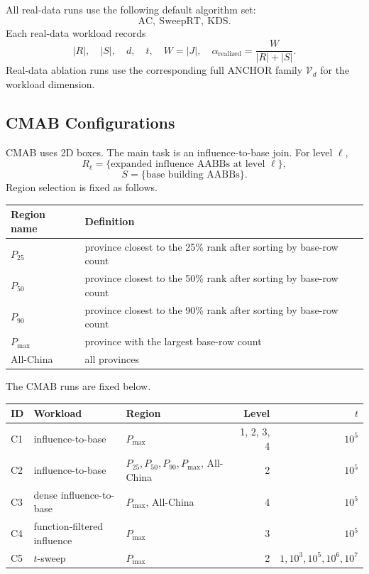 \documentclass[11pt]{article}
\newcommand{\ANCHOR}{\textsc{ANCHOR}}
\begin{document}
All real-data runs use the following default algorithm set:
\[
\boxed{\mathrm{AC},\ \mathrm{SweepRT},\ \mathrm{KDS}}.
\]
Each real-data workload records
\[
|R|,\quad |S|,\quad d,\quad t,\quad W=|J|,\quad
\alpha_{\mathrm{realized}}=\frac{W}{|R|+|S|}.
\]
Real-data ablation runs use the corresponding full \ANCHOR{} family $\mathcal{V}_d$ for the workload dimension.

\subsection{CMAB Configurations}
CMAB uses 2D boxes.  The main task is an influence-to-base join.  For level $\ell$,
\[
R_\ell=\{\text{expanded influence AABBs at level }\ell\},
\]
\[
S=\{\text{base building AABBs}\}.
\]
Region selection is fixed as follows.

\begin{center}
\begin{tabularx}{\linewidth}{@{}lY@{}}
\toprule
Region name & Definition \\
\midrule
$P_{25}$ & province closest to the 25\% rank after sorting by base-row count \\
$P_{50}$ & province closest to the 50\% rank after sorting by base-row count \\
$P_{90}$ & province closest to the 90\% rank after sorting by base-row count \\
$P_{\max}$ & province with the largest base-row count \\
All-China & all provinces \\
\bottomrule
\end{tabularx}
\end{center}

The CMAB runs are fixed below.

\begin{center}
\small
\begin{tabularx}{\linewidth}{@{}l Y Y r r@{}}
\toprule
ID & Workload & Region & Level & $t$ \\
\midrule
C1 & influence-to-base & $P_{\max}$ & 1, 2, 3, 4 & $10^5$ \\
C2 & influence-to-base & $P_{25},P_{50},P_{90},P_{\max}$, All-China & 2 & $10^5$ \\
C3 & dense influence-to-base & $P_{\max}$, All-China & 4 & $10^5$ \\
C4 & function-filtered influence & $P_{\max}$ & 3 & $10^5$ \\
C5 & $t$-sweep & $P_{\max}$ & 2 & $1,10^3,10^5,10^6,10^7$ \\
\bottomrule
\end{tabularx}
\end{center}
\end{document}
